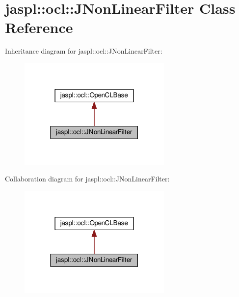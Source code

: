 \hypertarget{classjaspl_1_1ocl_1_1_j_non_linear_filter}{}\section{jaspl\+:\+:ocl\+:\+:J\+Non\+Linear\+Filter Class Reference}
\label{classjaspl_1_1ocl_1_1_j_non_linear_filter}


Inheritance diagram for jaspl\+:\+:ocl\+:\+:J\+Non\+Linear\+Filter\+:
\nopagebreak
\begin{figure}[H]
\begin{center}
\leavevmode
\includegraphics[width=213pt]{classjaspl_1_1ocl_1_1_j_non_linear_filter__inherit__graph}
\end{center}
\end{figure}


Collaboration diagram for jaspl\+:\+:ocl\+:\+:J\+Non\+Linear\+Filter\+:
\nopagebreak
\begin{figure}[H]
\begin{center}
\leavevmode
\includegraphics[width=213pt]{classjaspl_1_1ocl_1_1_j_non_linear_filter__coll__graph}
\end{center}
\end{figure}
